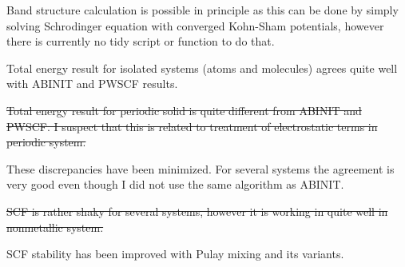 \documentclass[a4paper,10pt]{article}
\begin{document}
Band structure calculation is possible in principle as this can be
done by simply solving
Schrodinger equation with converged Kohn-Sham potentials, however there
is currently no tidy script or function to do that.

Total energy result for isolated systems (atoms and molecules) agrees quite
well with ABINIT and PWSCF results.

\sout{Total energy result for periodic solid is quite different from ABINIT and PWSCF.
I suspect that this is related to treatment of electrostatic terms in periodic system.}

These discrepancies have been minimized. For several systems the agreement is very good
even though I did not use the same algorithm as ABINIT.

\sout{SCF is rather shaky for several systems, however it is working in quite well in nonmetallic
system.}

SCF stability has been improved with Pulay mixing and its variants.
\end{document}
